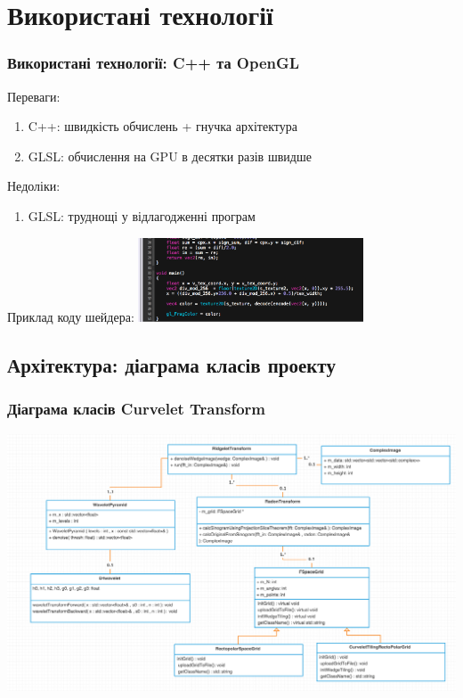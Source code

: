 \documentclass[12pt]{beamer}
\begin{document}
\section{Використані технології}
\begin{frame}\frametitle{Використані технології: C++ та OpenGL}
	Переваги:
	\begin{enumerate}
		\item C++: швидкість обчислень  + гнучка архітектура
		\item GLSL: обчислення на GPU в десятки разів швидше  
	\end{enumerate}
	Недоліки:
	\begin{enumerate}
		\item GLSL: труднощі у відлагодженні програм
	\end{enumerate}

	Приклад коду шейдера:
	\includegraphics[height=2.5cm]{images/shader_snapshot}
\end{frame}

\subsection{Архітектура: діаграма класів проекту}
\begin{frame}\frametitle{Діаграма класів Curvelet Transform}
	\includegraphics[scale=0.2]{images/class_diagram}
\end{frame}
\end{document}
